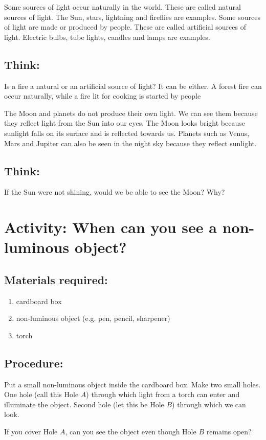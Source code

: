 \documentclass{xtufte-handout}
\begin{document}
Some sources of light occur naturally in the world. These are called natural sources of light. The Sun, stars, lightning and fireflies are examples. Some sources of light are made or produced by people. These are called artificial sources of light. Electric bulbs, tube lights, candles and lamps are examples.

\subsection{Think:} Is a fire a natural or an artificial source of light? It can be either. A forest fire can occur naturally, while a fire lit for cooking is started by people

The Moon and planets do not produce their own light. We can see them because they reflect light from the Sun into our eyes. The Moon looks bright because sunlight falls on its surface and is reflected towards us. Planets such as Venus, Mars and Jupiter can also be seen in the night sky because they reflect sunlight.

\subsection{Think:} If the Sun were not shining, would we be able to see the Moon? Why?

\section{Activity: When can you see a non-luminous object?}
\subsection{Materials required:}
\begin{enumerate}
    \item cardboard box
    \item non-luminous object (e.g. pen, pencil, sharpener)
    \item torch
\end{enumerate}
\subsection{Procedure:}
Put a small non-luminous object inside the cardboard box. Make two small holes. One hole (call this Hole $A$) through which light from a torch can enter and illuminate the object. Second hole (let this be Hole $B$) through which we can look. 

If you cover Hole $A$, can you see the object even though Hole $B$ remains open?
\end{document}

